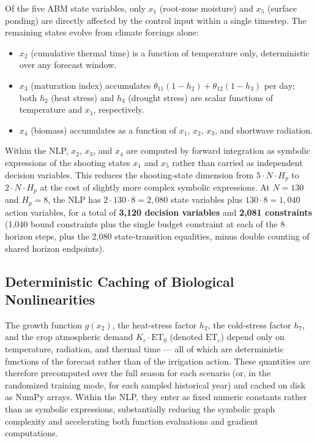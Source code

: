 Of the five ABM state variables, only $x_1$ (root-zone moisture) and $x_5$
(surface ponding) are directly affected by the control input within a single
timestep. The remaining states evolve from climate forcings alone:
\begin{itemize}
  \item $x_2$ (cumulative thermal time) is a function of temperature only,
    deterministic over any forecast window.
  \item $x_3$ (maturation index) accumulates $\theta_{11}(1-h_2)
    + \theta_{12}(1-h_3)$ per day; both $h_2$ (heat stress) and $h_3$
    (drought stress) are scalar functions of temperature and $x_1$,
    respectively.
  \item $x_4$ (biomass) accumulates as a function of $x_1$, $x_2$, $x_3$,
    and shortwave radiation.
\end{itemize}
Within the NLP, $x_2$, $x_3$, and $x_4$ are computed by forward integration
as symbolic expressions of the shooting states $x_1$ and $x_5$ rather than
carried as independent decision variables. This reduces the shooting-state
dimension from $5 \cdot N \cdot H_p$ to $2 \cdot N \cdot H_p$ at the cost
of slightly more complex symbolic expressions. At $N = 130$ and $H_p = 8$,
the NLP has $2 \cdot 130 \cdot 8 = 2{,}080$ state variables plus
$130 \cdot 8 = 1{,}040$ action variables, for a total of \textbf{3,120
decision variables} and \textbf{2,081 constraints} (1,040 bound constraints
plus the single budget constraint at each of the 8 horizon steps, plus the
2,080 state-transition equalities, minus double counting of shared horizon
endpoints).

\subsection{Deterministic Caching of Biological Nonlinearities}
\label{ssec:ctrl-caching}

The growth function $g(x_2)$, the heat-stress factor $h_2$, the
cold-stress factor $h_7$, and the crop atmospheric demand $K_c \cdot
\mathrm{ET}_0$ (denoted $\mathrm{ET}_c$) depend only on temperature,
radiation, and thermal time --- all of which are deterministic functions of
the forecast rather than of the irrigation action. These quantities are
therefore precomputed over the full season for each scenario (or, in the
randomized training mode, for each sampled historical year) and cached on
disk as NumPy arrays. Within the NLP, they enter as fixed numeric constants
rather than as symbolic expressions, substantially reducing the symbolic
graph complexity and accelerating both function evaluations and gradient
computations.

